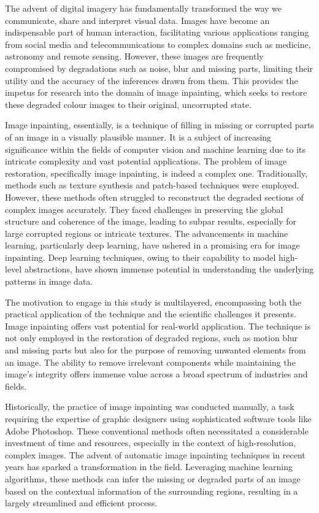 

The advent of digital imagery has fundamentally transformed the way we communicate, share and interpret visual data. Images have become an indispensable part of human interaction, facilitating various applications ranging from social media and telecommunications to complex domains such as medicine, astronomy and remote sensing. However, these images are frequently compromised by degradations such as noise, blur and missing parts, limiting their utility and the accuracy of the inferences drawn from them. This provides the impetus for research into the domain of image inpainting, which seeks to restore these degraded colour images to their original, uncorrupted state.

Image inpainting, essentially, is a technique of filling in missing or corrupted parts of an image in a visually plausible manner. It is a subject of increasing significance within the fields of computer vision and machine learning due to its intricate complexity and vast potential applications. The problem of image restoration, specifically image inpainting, is indeed a complex one. Traditionally, methods such as texture synthesis and patch-based techniques were employed. However, these methods often struggled to reconstruct the degraded sections of complex images accurately. They faced challenges in preserving the global structure and coherence of the image, leading to subpar results, especially for large corrupted regions or intricate textures. The advancements in machine learning, particularly deep learning, have ushered in a promising era for image inpainting. Deep learning techniques, owing to their capability to model high-level abstractions, have shown immense potential in understanding the underlying patterns in image data.

The motivation to engage in this study is multilayered, encompassing both the practical application of the technique and the scientific challenges it presents. Image inpainting offers vast potential for real-world application. The technique is not only employed in the restoration of degraded regions, such as motion blur and missing parts but also for the purpose of removing unwanted elements from an image. The ability to remove irrelevant components while maintaining the image's integrity offers immense value across a broad spectrum of industries and fields.

Historically, the practice of image inpainting was conducted manually, a task requiring the expertise of graphic designers using sophisticated software tools like Adobe Photoshop. These conventional methods often necessitated a considerable investment of time and resources, especially in the context of high-resolution, complex images. The advent of automatic image inpainting techniques in recent years has sparked a transformation in the field. Leveraging machine learning algorithms, these methods can infer the missing or degraded parts of an image based on the contextual information of the surrounding regions, resulting in a largely streamlined and efficient process.

